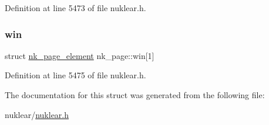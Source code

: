 Definition at line 5473 of file nuklear.\+h.

\mbox{\label{structnk__page_a217456877442e5b9a21be2042d50cb1b}} 
\subsubsection{\texorpdfstring{win}{win}}
{\footnotesize\ttfamily struct \mbox{\hyperlink{structnk__page__element}{nk\+\_\+page\+\_\+element}} nk\+\_\+page\+::win\mbox{[}1\mbox{]}}



Definition at line 5475 of file nuklear.\+h.



The documentation for this struct was generated from the following file\+:\begin{DoxyCompactItemize}
\item 
nuklear/\mbox{\hyperlink{nuklear_8h}{nuklear.\+h}}\end{DoxyCompactItemize}
